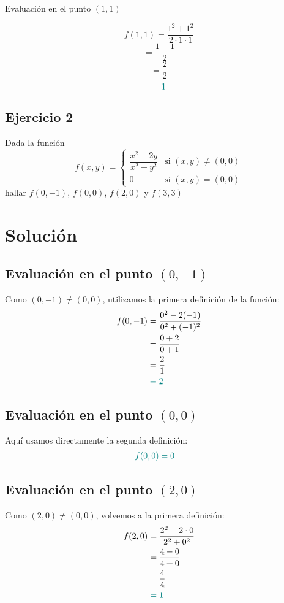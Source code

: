 \documentclass{article}
\begin{document}
Evaluación en el punto $(1, 1)$

\[
f(1, 1) = \frac{1^2 + 1^2}{2 \cdot 1 \cdot 1}
\]
\[
= \frac{1 + 1}{2}
\]
\[
= \frac{2}{2}
\]
\[
\color{teal}= 1
\]


\newpage
\subsection{Ejercicio 2}

Dada la función
\[
f(x, y) =
\begin{cases}
\dfrac{x^2 - 2y}{x^2 + y^2} & \text{si } (x, y)\neq (0,0)\\[6pt]
0 & \text{si } (x, y)=(0,0)
\end{cases}
\]
hallar \(f(0,-1)\), \(f(0,0)\), \(f(2,0)\) y \(f(3,3)\)

\newpage

\section*{Solución}
\subsection*{Evaluación en el punto \((0,-1)\)}

Como \((0,-1)\neq(0,0)\), utilizamos la primera definición de la función:
\begin{align*}
f(0,-1) &= \frac{0^2 - 2(-1)}{0^2 + (-1)^2} \\
        &= \frac{0 + 2}{0 + 1} \\
        &= \frac{2}{1} \\
        &\color{teal}=2
\end{align*}

\subsection*{Evaluación en el punto \((0,0)\)}

Aquí usamos directamente la segunda definición:
\begin{align*}
\color{teal}f(0,0) &\color{teal}=0
\end{align*}

\subsection*{Evaluación en el punto \((2,0)\)}

Como \((2,0)\neq(0,0)\), volvemos a la primera definición:
\begin{align*}
f(2,0) &= \frac{2^2 - 2\cdot0}{2^2 + 0^2} \\
       &= \frac{4 - 0}{4 + 0} \\
       &= \frac{4}{4} \\
       &\color{teal}=1
\end{align*}
\end{document}
